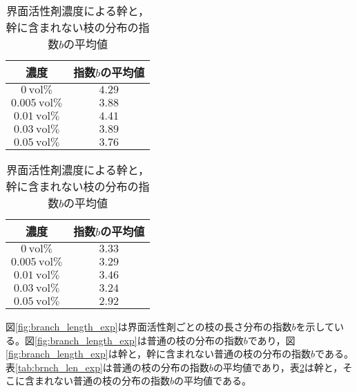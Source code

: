 \documentclass[autodetect-engine,dvi=dvipdfmx,a4paper,ja=standard,oneside,openany,11pt]{bxjsbook}
\begin{document}
\begin{table}[htbp]
  \begin{minipage}{0.45\textwidth}
    \centering
    \caption{界面活性剤濃度による普通の枝の分布の指数$b$の平均値}
    \begin{tabular}{|c|c|}
      \hline
      濃度                           & 指数$b$の平均値 \\ \hline\hline
      $\SI{0}{\mathrm{vol}\%}$     & $4.29$    \\ \hline
      $\SI{0.005}{\mathrm{vol}\%}$ & $3.88$    \\ \hline
      $\SI{0.01}{\mathrm{vol}\%}$  & $4.41$    \\ \hline
      $\SI{0.03}{\mathrm{vol}\%}$  & $3.89$    \\ \hline
      $\SI{0.05}{\mathrm{vol}\%}$  & $3.76$    \\
      \hline
    \end{tabular}
    \label{tab:brnch_len_exp}
  \end{minipage}
  \hfill
  \begin{minipage}{0.45\textwidth}
    \centering
    \caption{界面活性剤濃度による幹と，幹に含まれない枝の分布の指数$b$の平均値}
    \begin{tabular}{|c|c|}
      \hline
      濃度                           & 指数$b$の平均値 \\ \hline\hline
      $\SI{0}{\mathrm{vol}\%}$     & $3.33$    \\ \hline
      $\SI{0.005}{\mathrm{vol}\%}$ & $3.29$    \\ \hline
      $\SI{0.01}{\mathrm{vol}\%}$  & $3.46$    \\ \hline
      $\SI{0.03}{\mathrm{vol}\%}$  & $3.24$    \\ \hline
      $\SI{0.05}{\mathrm{vol}\%}$  & $2.92$    \\
      \hline
    \end{tabular}
    \label{tab:branch_len_exp_edited}
  \end{minipage}
\end{table}

図\ref{fig:branch_length_exp}は界面活性剤ごとの枝の長さ分布の指数$b$を示している。図\ref{fig:branch_length_exp}は普通の枝の分布の指数$b$であり，図\ref{fig:branch_length_exp}は幹と，幹に含まれない普通の枝の分布の指数$b$である。表\ref{tab:brnch_len_exp}は普通の枝の分布の指数$b$の平均値であり，表\ref{tab:branch_len_exp_edited}は幹と，そこに含まれない普通の枝の分布の指数$b$の平均値である。
\end{document}

